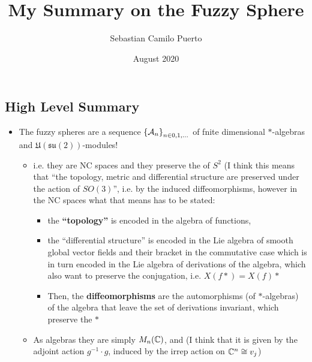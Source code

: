 \documentclass{article}
\title{My Summary on the Fuzzy Sphere}
\author{Sebastian Camilo Puerto}
\date{August 2020}
\begin{document}
\maketitle

\tableofcontents

\subsection{High Level Summary}

    \begin{itemize}

    \item The fuzzy spheres are a sequence $\left\{ \mathcal A_n \right\}_{n \in 0, 1, \dots}$ of fnite dimensional $*$-algebras and $\mathfrak{U(su(2))}$-modules!
    
        \begin{itemize}
            
        \item i.e. they are NC spaces and they preserve the  of $S^2$ (I think this means that ``the topology, metric and differential structure are preserved under the action of $SO(3)$'', i.e. by the induced diffeomorphisms, however in the NC spaces what that means has to be stated: 
        
            \begin{itemize}
            
            \item the \textbf{``topology''} is encoded in the algebra of functions,
            
            \item the ``differential structure'' is encoded in the Lie algebra of smooth global vector fields and their bracket in the commutative case which is in turn encoded in the Lie algebra of derivations of the algebra, \tiny{which also want to preserve the conjugation, i.e. $X(f*) = X(f)*$}
            
            \item Then, the \textbf{diffeomorphisms} are the automorphisms (of $*$-algebras) of the algebra that leave the set of derivations invariant, \tiny{which preserve the $*$}
                
            \end{itemize} 
            
        \item As algebras they are simply $M_n(\mathbb{C})$, and  (I think that it is given by the adjoint action $g^{-1}\cdot g$, induced by the irrep action on $\mathbb{C}^{n} \cong v_j$)
        

\end{itemize}
\end{itemize}
\end{document}
